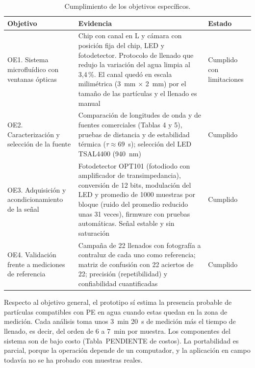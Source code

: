 \begin{table}[htbp]
  \centering
  \caption{Cumplimiento de los objetivos específicos.}
  \label{tab:objetivos}
  \small
  \begin{tabular}{p{}p{}p{}}
    \hline
    Objetivo & Evidencia & Estado \\
    \hline
    OE1. Sistema microfluídico con ventanas ópticas &
      Chip con canal en L y cámara con posición fija del chip, LED y fotodetector.
      Protocolo de llenado que redujo la variación del agua limpia al 3,4\,\%. El canal
      quedó en escala milimétrica (3~mm $\times$ 2~mm) por el tamaño de las partículas y el
      llenado es manual &
      Cumplido con limitaciones \\
    OE2. Caracterización y selección de la fuente &
      Comparación de longitudes de onda y de fuentes comerciales (Tablas 4 y 5), pruebas
      de distancia y de estabilidad térmica ($\tau \approx 69$~s); selección del LED
      TSAL4400 (940~nm) &
      Cumplido \\
    OE3. Adquisición y acondicionamiento de la señal &
      Fotodetector OPT101 (fotodiodo con amplificador de transimpedancia), conversión de 12 bits,
      modulación del LED y promedio de 1000 muestras por bloque (ruido del promedio
      reducido unas 31 veces), firmware con pruebas automáticas. Señal estable y sin
      saturación &
      Cumplido \\
    OE4. Validación frente a mediciones de referencia &
      Campaña de 22 llenados con fotografía a contraluz de cada uno como referencia;
      matriz de confusión con 22 aciertos de 22; precisión (repetibilidad) y confiabilidad
      cuantificadas &
      Cumplido \\
    \hline
  \end{tabular}
\end{table}

Respecto al objetivo general, el prototipo sí estima la presencia probable de partículas
compatibles con PE en agua cuando estas quedan en la zona de medición. Cada análisis toma
unos 3~min 20~s de medición más el tiempo de llenado, es decir, del orden de 6 a 7~min por
muestra. Los componentes del sistema son de bajo costo (Tabla~PENDIENTE de costos). La
portabilidad es parcial, porque la operación depende de un computador, y la aplicación en
campo todavía no se ha probado con muestras reales.



